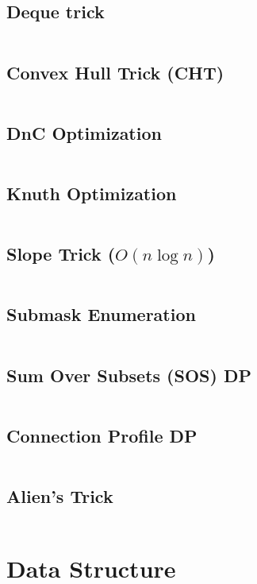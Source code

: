 \documentclass[8pt, a4paper, oneside]{extarticle}
\begin{document}
\begin{multicols*}{2}
\subsection{Deque trick}
\inputminted{c++}{codes/dp/deque_trick.cpp}

\subsection{Convex Hull Trick (CHT)}
\inputminted{c++}{codes/dp/cht.cpp}

\subsection{DnC Optimization}
\inputminted{c++}{codes/dp/dnc.cpp}

\subsection{Knuth Optimization}
\inputminted{c++}{codes/dp/knuth.cpp}

\subsection{Slope Trick ($O(n \log n)$)}
\inputminted{c++}{codes/dp/slope_trick.cpp}

\subsection{Submask Enumeration}
\inputminted{c++}{codes/dp/submask.cpp}

\subsection{Sum Over Subsets (SOS) DP}
\inputminted{c++}{codes/dp/sos_dp.cpp}

\subsection{Connection Profile DP}
\inputminted{c++}{codes/dp/connection_profile_dp.cpp}

\subsection{Alien's Trick}
\inputminted{c++}{codes/dp/alien_trick.cpp}

\section{Data Structure}

\end{multicols*}
\end{document}
